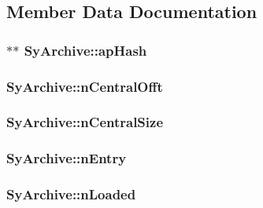 \subsection{Member Data Documentation}
\hypertarget{struct_sy_archive_a284e6d5eb3c8da3b74e18f48b18456fe}{
\subsubsection[{ap\-Hash}]{$\ast$$\ast$ Sy\-Archive\-::ap\-Hash}}\label{dd/d4c/struct_sy_archive_a284e6d5eb3c8da3b74e18f48b18456fe}
\hypertarget{struct_sy_archive_a3b061b0e6658501f80738f9ad728dd24}{
\subsubsection[{n\-Central\-Offt}]{ Sy\-Archive\-::n\-Central\-Offt}}\label{dd/d4c/struct_sy_archive_a3b061b0e6658501f80738f9ad728dd24}
\hypertarget{struct_sy_archive_ab4f232e7f54707c10ea541a94dd14a1b}{
\subsubsection[{n\-Central\-Size}]{ Sy\-Archive\-::n\-Central\-Size}}\label{dd/d4c/struct_sy_archive_ab4f232e7f54707c10ea541a94dd14a1b}
\hypertarget{struct_sy_archive_a870e191dc2fdb9b904eccef04bc5c940}{
\subsubsection[{n\-Entry}]{ Sy\-Archive\-::n\-Entry}}\label{dd/d4c/struct_sy_archive_a870e191dc2fdb9b904eccef04bc5c940}
\hypertarget{struct_sy_archive_ab357148740292e6c13a0fafd47188589}{
\subsubsection[{n\-Loaded}]{ Sy\-Archive\-::n\-Loaded}}\label{dd/d4c/struct_sy_archive_ab357148740292e6c13a0fafd47188589}
